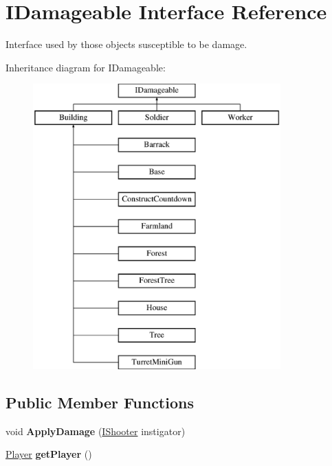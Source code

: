 \hypertarget{interface_i_damageable}{}\section{I\+Damageable Interface Reference}
\label{interface_i_damageable}


Interface used by those objects susceptible to be damage.  


Inheritance diagram for I\+Damageable\+:\begin{figure}[H]
\begin{center}
\leavevmode
\includegraphics[height=11.000000cm]{interface_i_damageable}
\end{center}
\end{figure}
\subsection*{Public Member Functions}
\begin{DoxyCompactItemize}
\item 
\mbox{\label{interface_i_damageable_a60523c16d20d583b9aa31a6f8863bd9f}} 
void {\bfseries Apply\+Damage} (\mbox{\hyperlink{interface_i_shooter}{I\+Shooter}} instigator)
\item 
\mbox{\label{interface_i_damageable_aeafdde05468fcaed706905e46fa0a6fd}} 
\mbox{\hyperlink{class_player}{Player}} {\bfseries get\+Player} ()
\end{DoxyCompactItemize}


